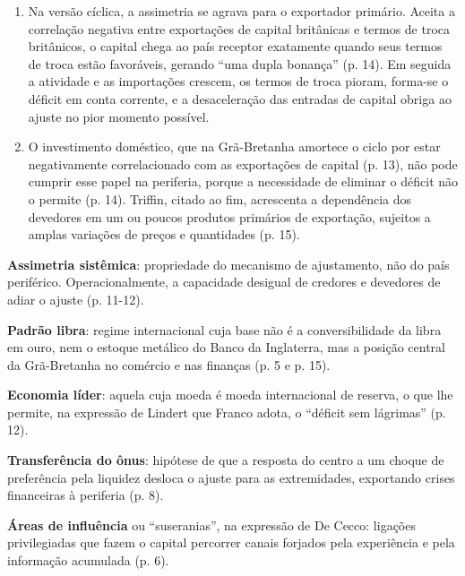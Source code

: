 \begin{enumerate}[leftmargin=*,nosep]
\item Na versão cíclica, a assimetria se agrava para o exportador primário.
Aceita a correlação negativa entre exportações de capital britânicas e termos
de troca britânicos, o capital chega ao país receptor exatamente quando seus
termos de troca estão favoráveis, gerando ``uma dupla bonança'' (p. 14). Em
seguida a atividade e as importações crescem, os termos de troca pioram, forma-se
o déficit em conta corrente, e a desaceleração das entradas de capital obriga
ao ajuste no pior momento possível.


\item O investimento doméstico, que na Grã-Bretanha amortece o ciclo por estar
negativamente correlacionado com as exportações de capital (p. 13), não pode
cumprir esse papel na periferia, porque a necessidade de eliminar o déficit não
o permite (p. 14). Triffin, citado ao fim, acrescenta a dependência dos
devedores em um ou poucos produtos primários de exportação, sujeitos a amplas
variações de preços e quantidades (p. 15).
\end{enumerate}


\textbf{Assimetria sistêmica}: propriedade do mecanismo de ajustamento, não do
país periférico. Operacionalmente, a capacidade desigual de credores e
devedores de adiar o ajuste (p. 11-12).

\textbf{Padrão libra}: regime internacional cuja base não é a conversibilidade
da libra em ouro, nem o estoque metálico do Banco da Inglaterra, mas a posição
central da Grã-Bretanha no comércio e nas finanças (p. 5 e p. 15).

\textbf{Economia líder}: aquela cuja moeda é moeda internacional de reserva, o
que lhe permite, na expressão de Lindert que Franco adota, o ``déficit sem
lágrimas'' (p. 12).

\textbf{Transferência do ônus}: hipótese de que a resposta do centro a um choque
de preferência pela liquidez desloca o ajuste para as extremidades, exportando
crises financeiras à periferia (p. 8).

\textbf{Áreas de influência} ou ``suseranias'', na expressão de De Cecco:
ligações privilegiadas que fazem o capital percorrer canais forjados pela
experiência e pela informação acumulada (p. 6).


